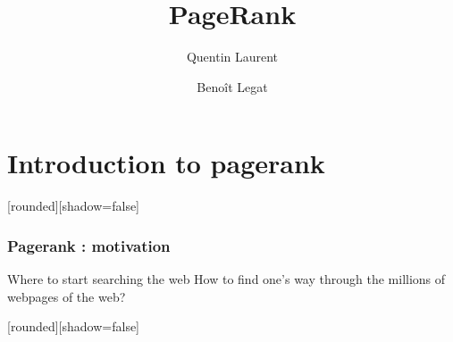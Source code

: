 \documentclass[10pt]{beamer}
\title{PageRank}
\author{
  Quentin Laurent
  \and
  Benoît Legat
}
\begin{document}
\begin{frame}
  \maketitle
\end{frame}
\begin{frame}
\tableofcontents
\end{frame}
\section{Introduction to pagerank}
[rounded][shadow=false]
\begin{frame}
\frametitle{Pagerank : motivation}
	\begin{block}{Where to start searching the web}
	How to find one's way through the millions of webpages of the web?
	\end{block}
\end{frame}
[rounded][shadow=false]
\end{document}
